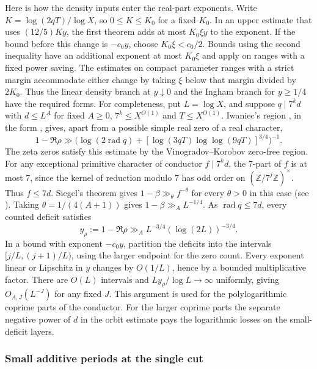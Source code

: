 \documentclass[11pt,a4paper]{article}
\theoremstyle{paperplain}
\numberwithin{equation}{section}
\begin{document}
Here is how the density inputs enter the real-part exponents.
Write $K=\log(2qT)/\log X$, so $0\leq K\leq K_0$ for a fixed
$K_0$. In an upper estimate that uses $(12/5)Ky$, the first theorem
adds at most $K_0\xi y$ to the exponent. If the bound before this
change is $-c_0 y$, choose $K_0\xi<c_0/2$. Bounds using the second
inequality have an additional exponent at most $K_0\xi$ and apply
on ranges with a fixed power saving. The estimates on compact
parameter ranges with a strict margin accommodate either change by
taking $\xi$ below that margin divided by $2K_0$.
Thus the linear density branch at $y\downarrow0$ and the Ingham
branch for $y\geq1/4$ have the required forms. For completeness, put $L=\log X$, and suppose $q\mid7^k d$ with
$d\leq L^A$ for fixed $A\geq0$, $7^k\leq X^{O(1)}$ and
$T\leq X^{O(1)}$. Iwaniec's region \cite[Theorem~2]{Iwaniec1974}, in the form
\cite[(3.1)]{ThornerZaman}, gives, apart from a possible simple real
zero of a real character,
\[
 1-\Re\rho\gg
 \bigl(\log(2\operatorname{rad}q)+
  [\log(3qT)\log\log(9qT)]^{3/4}\bigr)^{-1}.
\]
The zeta zeros satisfy this estimate by the Vinogradov--Korobov
zero-free region. For any exceptional primitive character of
conductor $f\mid 7^k d$, the $7$-part of $f$ is at most $7$,
since the kernel of reduction modulo $7$ has odd order on
$(\mathbb Z/7^j\mathbb Z)^\times$. Thus $f\leq 7d$. Siegel's
theorem gives $1-\beta\gg_{\theta}f^{-\theta}$ for every
$\theta>0$ in this case (see \cite[Theorem~5.28]{IwaniecKowalski2004}).
Taking $\theta=1/(4(A+1))$ gives $1-\beta\gg_A L^{-1/4}$.
As $\operatorname{rad}q\leq7d$, every counted deficit satisfies
\[
     y_\rho:=1-\Re\rho\gg_A
                    L^{-3/4}(\log(2L))^{-3/4}.
\]
In a bound with exponent $-c_0y$, partition the deficits into the
intervals $[j/L,(j+1)/L)$, using the larger endpoint for the
zero count. Every exponent linear or Lipschitz in $y$ changes by
$O(1/L)$, hence by a bounded multiplicative factor. There are
$O(L)$ intervals and $L y_\rho/\log L\to\infty$ uniformly, giving
$O_{A,J}(L^{-J})$ for any fixed $J$. This argument is used for
the polylogarithmic coprime parts of the conductor. For the larger
coprime parts the separate negative power of $d$ in the orbit
estimate pays the logarithmic losses on the small-deficit layers.


\subsubsection{Small additive periods at the single cut}\label{seven:small}
\end{document}
